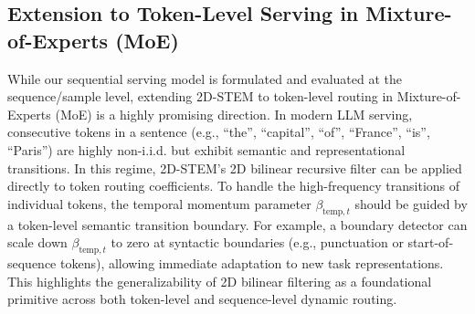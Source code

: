 \subsection{Extension to Token-Level Serving in Mixture-of-Experts (MoE)}
While our sequential serving model is formulated and evaluated at the sequence/sample level, extending 2D-STEM to token-level routing in Mixture-of-Experts (MoE) is a highly promising direction. In modern LLM serving, consecutive tokens in a sentence (e.g., ``the'', ``capital'', ``of'', ``France'', ``is'', ``Paris'') are highly non-i.i.d. but exhibit semantic and representational transitions. In this regime, 2D-STEM's 2D bilinear recursive filter can be applied directly to token routing coefficients. To handle the high-frequency transitions of individual tokens, the temporal momentum parameter $\beta_{\text{temp}, t}$ should be guided by a token-level semantic transition boundary. For example, a boundary detector can scale down $\beta_{\text{temp}, t}$ to zero at syntactic boundaries (e.g., punctuation or start-of-sequence tokens), allowing immediate adaptation to new task representations. This highlights the generalizability of 2D bilinear filtering as a foundational primitive across both token-level and sequence-level dynamic routing.
